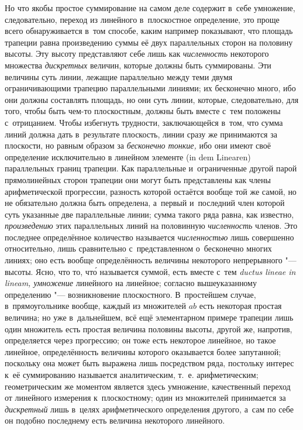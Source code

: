 Но что якобы простое суммирование на самом деле содержит в~себе умножение,
следовательно, переход из линейного в~плоскостное определение, это проще всего
обнаруживается в~том способе, каким например показывают, что площадь трапеции
равна произведению суммы её двух параллельных сторон на половину высоты. Эту
высоту представляют себе лишь как {\em численность} некоторого множества
{\em дискретных} величин, которые должны быть суммированы. Эти величины суть
линии, лежащие параллельно между теми двумя ограничивающими трапецию
параллельными линиями; их бесконечно много, ибо они должны составлять площадь,
но они суть линии, которые, следовательно, для того, чтобы быть чем-то
плоскостным, должны быть вместе с~тем положены с~отрицанием. Чтобы избегнуть
трудности, заключающейся в~том, что сумма линий должна дать в~результате
плоскость, линии сразу же принимаются за плоскости, но равным образом за
{\em бесконечно тонкие,} ибо они имеют своё определение исключительно в
линейном элементе (in dem Li\-nea\-ren) параллельных границ трапеции. Как
параллельные и~ограниченные другой парой прямолинейных сторон трапеции они
могут быть представлены как члены арифметической прогрессии, разность которой
остаётся вообще той же самой, но не обязательно должна быть определена,
а~первый и~последний член которой суть указанные две параллельные линии; сумма
такого ряда равна, как известно, {\em произведению} этих параллельных линий на
половинную {\em численность} членов. Это последнее определённое количество
называется {\em численностью} лишь совершенно относительно, лишь сравнительно
с~представленном о~бесконечно многих линиях; оно есть вообще определённость
величины некоторого {непрерывного} "--- высоты. Ясно, что то, чт\'{о} называется
суммой, есть вместе с~тем {\em ductus lineae in lineam, умножение}
линейного на линейное; согласно вышеуказанному определению "--- возникновение
плоскостного. В~простейшем случае, в~прямоугольнике вообще, каждый из
множителей $ab$ есть некоторая простая величина; но уже в~дальнейшем, всё ещё
элементарном примере трапеции лишь один множитель есть простая величина
половины высоты, другой же, напротив, определяется через прогрессию; он тоже
есть некоторое линейное, но такое линейное, определённость величины которого
оказывается более запутанной; поскольку она может быть выражена лишь
посредством ряда, постольку интерес к~её суммированию называется аналитическим,
т.~е. арифметическим; геометрическим же моментом является здесь умножение,
качественный переход от линейного измерения к~плоскостному; один из
множителей принимается за {\em дискретный} лишь в~целях
арифметического определения другого, а~сам по себе он
подобно последнему есть величина некоторого линейного.

